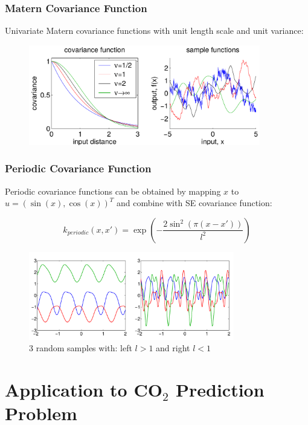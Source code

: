 \documentclass[10pt]{beamer}
\begin{document}
  \begin{frame}
    \frametitle{Matern Covariance Function}
    Univariate Matern covariance functions with unit length scale and unit variance:

    \begin{figure}
      \centering
      \includegraphics[width=0.9\textwidth]{maternCovFunc.png}
    \end{figure}
  \end{frame}

  \begin{frame}
    \frametitle{Periodic Covariance Function}
    Periodic covariance functions can be obtained by mapping $x$ to $u = (\sin(x), \cos(x))^T$ and combine with SE covariance function:

    \begin{equation*}
      k_{periodic} (x,x') = \exp \left( - \frac{2 \sin^2(\pi (x - x'))}{l^2} \right)
    \end{equation*}

    \begin{figure}
      \centering
      \includegraphics[width=0.8\textwidth]{periodicCovFunc.png}
      \caption*{3 random samples with: left $l > 1$ and right $l < 1$}
    \end{figure}
  \end{frame}

  \section{Application to CO$_2$ Prediction Problem}
\end{document}
